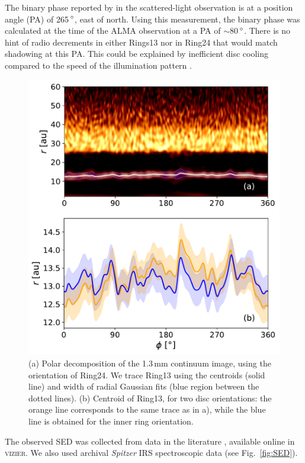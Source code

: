 \documentclass[usenatbib,times]{mnras}
\begin{document}
The binary phase reported by \citet{dOrazi} in the scattered-light observation is at a position angle (PA) of 265\,$\hbox{$^\circ$}$, east of north. Using this measurement, the binary phase was calculated at the time of the ALMA observation at a PA of $\sim$80\,$\hbox{$^\circ$}$. There is no hint of radio decrements in either Rings13 nor in Ring24 that would match shadowing at this PA. This could be explained by inefficient disc cooling compared to the speed of the illumination pattern \citep[see ][ for estimates of this cooling timescale]{Casassus2019MNRAS.486L..58C}. 

\begin{figure}
    \includegraphics[width=\columnwidth]{polar_ring_aprox_and_diff_inner.pdf}
    \caption{(a) Polar decomposition of the 1.3\,mm continuum image, using the orientation of Ring24. We trace Ring13 using the centroids (solid line) and width of radial Gaussian fits (blue region between the dotted lines). (b) Centroid of Ring13, for two disc orientations: the orange line corresponds to the same trace as in a), while the blue line is obtained for the inner ring orientation.}
    \label{fig:polarring}
\end{figure}

The observed SED was collected from data in the literature \citep{1988iras....7.....H, 1990A&A...234..230H, Jensen_97, 2000A&A...355L..27H, 2001KFNT...17..409K, 2003yCat.2246....0C, 2007PASJ...59S.369M, 2008PASP..120.1128O, 2010A&A...514A...1I, 2012yCat.2311....0C}, available online in \textsc{vizier}. We also  used  archival \textit{Spitzer} IRS spectroscopic data (see Fig.~\ref{fig:SED}). 
\end{document}
